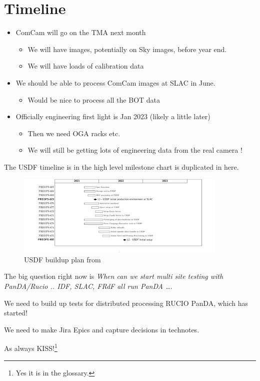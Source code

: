 \section{Timeline}


\begin{itemize}
\item ComCam will go on the TMA next month
	\begin{itemize}
	\item We will have images, potentially on Sky images, before year end.
	\item We will have loads of calibration data
	\end{itemize}
\item We should be able to process ComCam images at SLAC in June.
	\begin{itemize}
	\item Would be nice to process all the BOT data
	\end{itemize}
\item Officially engineering first light is Jan 2023 (likely a little later)
	\begin{itemize}
	\item Then we need OGA racks etc.
	\item We will still be getting lots of engineering data from the real camera !
	\end{itemize}
\end{itemize}

The USDF timeline is in  the high level milestone chart is duplicated in here.


\begin{figure}
\begin{centering}
\includegraphics[width=0.9\textwidth]{USDFplan}
	\caption{USDF buildup plan from \label{fig:usdfplan}}
\end{centering}
\end{figure}

The big question right now is {\em When can we start multi site testing with PanDA/Rucio ..
IDF, SLAC, FRdF all run PanDA \ldots}.

We need to build up tests for distributed processing RUCIO PanDA, which has started!


We need to make Jira Epics and capture decisions in technotes.

As always KISS!\footnote{Yes it is in the glossary.}


